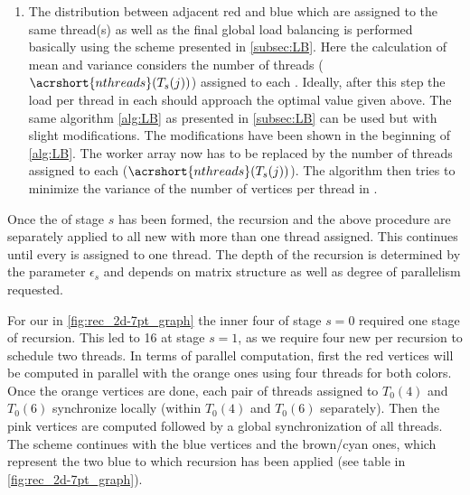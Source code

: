 \begin{enumerate}
	\item The distribution between adjacent red and blue \levelGroups which are assigned to the same thread(s) as well as the final global load balancing is performed basically using the scheme presented in \cref{subsec:LB}. 
	Here the calculation of mean and variance considers the number of threads ($\acrshort{nthreads}(T_{s}(j))$) assigned to each \levelGroup . Ideally, after this step the load per thread in each \levelGroup should approach the optimal value given above.
	The same algorithm \cref{alg:LB} as presented in \cref{subsec:LB} can be used but with slight modifications. The modifications have been shown in the beginning of \cref{alg:LB}. The worker array now has to be replaced by the number of threads assigned to each \levelGroup ($\acrshort{nthreads}(T_{s}(j))$). The algorithm then tries to minimize the variance of the number of vertices per thread in \levelGroups.
\end{enumerate}
Once the \levelGroup of stage $s$ has been formed, the recursion and the above procedure are separately applied to all new \levelGroups with more than one thread assigned. This continues until every \levelGroup is assigned to one thread. The depth of the recursion is determined by the parameter $\epsilon_s$ and depends on matrix structure as well as degree of parallelism requested. 

For our \stex in  \cref{fig:rec_2d-7pt_graph} the inner four \levelGroups of stage $s=0$ required one stage of recursion. This led to 16 \levelGroups at stage $s=1$, as we require four new \levelGroups per recursion to schedule two threads. 
In terms of parallel computation, first the red vertices will be computed in parallel with the orange ones using four threads for both colors. Once the orange vertices are done, each pair of threads assigned to $T_0(4)$ and $T_0(6)$ synchronize locally (\ie within $T_0(4)$ and $T_0(6)$ separately). Then the pink vertices are computed followed by a global synchronization of all threads. The scheme continues with the blue vertices and the brown/cyan ones, which represent the two blue \levelGroups to which recursion has been applied (see table in \cref{fig:rec_2d-7pt_graph}).  


